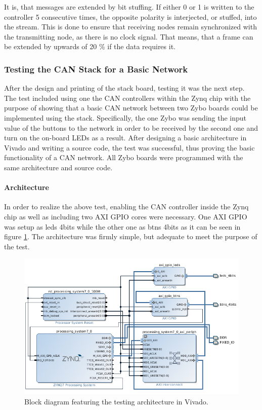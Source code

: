 It is, that messages are extended by bit stuffing.
If either 0 or 1 is written to the controller 5 consecutive times, the opposite polarity is interjected, or stuffed, into the stream. 
This is done to ensure that receiving nodes remain synchronized with the transmitting node, as there is no clock signal.
That means, that a frame can be extended by upwards of 20 \% if the data requires it.


\subsubsection{Testing the CAN Stack for a Basic Network}

After the design and printing of the stack board, testing it was the next step.
The test included using one the CAN controllers within the Zynq chip with the purpose of showing that a basic CAN network between two Zybo boards could be implemented using the stack.
Specifically, the one Zybo was sending the input value of the buttons to the network in order to be received by the second one and turn on the on-board LEDs as a result.
After designing a basic architecture in Vivado and writing a source code, the test was successful, thus proving the basic functionality of a CAN network.
All Zybo boards were programmed with the same architecture and source code.

\paragraph{Architecture}
In order to realize the above test, enabling the CAN controller inside the Zynq chip as well as including two AXI GPIO cores were necessary.
One AXI GPIO was setup as leds 4bits while the other one as btns 4bits as it can be seen in figure \ref{fig:CAN_Testing_Architecture}. The architecture was firmly simple, but adequate to meet the purpose of the test.

\begin{figure}[h!]
	\centering
	\includegraphics[width = 0.9\linewidth]{graphics/Zybo_BasicTestingArchitecture_for_CAN.png}
	\caption{Block diagram featuring the testing architecture in Vivado.}
	\label{fig:CAN_Testing_Architecture}
\end{figure}

